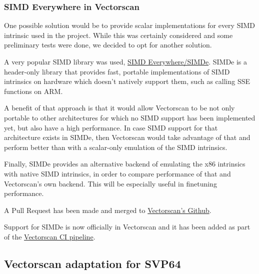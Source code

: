 \subsubsection{SIMD Everywhere in Vectorscan}

One possible solution would be to provide scalar implementations for every SIMD intrinsic used in the project.
While this was certainly considered and some preliminary tests were done, we decided to opt for another solution.

A very popular SIMD library was used, \href{https://github.com/simd-everywhere/simde}{SIMD Everywhere/SIMDe}.
SIMDe is a header-only library that provides fast, portable implementations of SIMD intrinsics on hardware which doesn't natively support them, such as calling SSE functions on ARM.

A benefit of that approach is that it would allow Vectorscan to be not only portable to other architectures for which no SIMD support has been implemented yet, but also have a high performance.
In case SIMD support for that architecture exists in SIMDe, then Vectorscan would take advantage of that and perform better than with a scalar-only emulation of the SIMD intrinsics.

Finally, SIMDe provides an alternative backend of emulating the x86 intrinsics with native SIMD intrinsics, in order to compare performance of that and Vectorscan's own backend. This will be especially useful in finetuning performance.

A Pull Request has been made and merged to \href{https://github.com/VectorCamp/vectorscan/pull/203}{Vectorscan's Github}.

Support for SIMDe is now officially in Vectorscan and it has been added as part of the \href{https://buildbot-ci.vectorcamp.gr/#/grid}{Vectorscan CI pipeline}.

\subsection{Vectorscan adaptation for SVP64}


